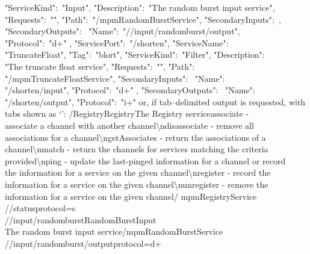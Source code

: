 "ServiceKind":\ "Input", "Description":\ "The random burst input service",\\
"Requests":\ "", "Path":\ "\textellipsis/mpmRandomBurstService", "SecondaryInputs":\
\sqPair,\\
"SecondaryOutputs":\ \openSq{} \textbraceleft{} "Name":\ 
"/\serviceName/input/randomburst/output",\\
"Protocol":\ "d+" \textbraceright{} \closeSq{} \textbraceright, \textbraceleft{}
"ServicePort":\  "/shorten", "ServiceName":\ \\
"TruncateFloat", "Tag":\ "blort", "ServiceKind":\ "Filter", "Description":\ \\
"The truncate float service", "Requests":\ "", "Path":\ \\
"\textellipsis/mpmTruncateFloatService", "SecondaryInputs":\ \openSq{} \textbraceleft{}
"Name":\ \\
"/shorten/input", "Protocol":\ "d+" \textbraceright{} \closeSq, "SecondaryOutputs":\ 
\openSq{} \textbraceleft{} "Name":\ \\
"/shorten/output", "Protocol":\ "i+" \textbraceright{} \closeSq{} \textbraceright{}
\closeSq
\outputEnd{}
or, if tab--delimited output is requested, with tabs shown as `\tabSymbol':
\outputBegin{}
/\dollarService\pseudotab{}Registry\pseudotab{}Registry\pseudotab\pseudotab{}The Registry
service\pseudotab{}associate - \\
associate a channel with another channel\textbackslash{}ndisassociate - remove all\\
associations for a channel\textbackslash{}ngetAssociates - return the associations of a\\
channel\textbackslash{}nmatch - return the channels for services matching the criteria\\
provided\textbackslash{}nping - update the last-pinged information for a channel or
record\\
the information for a service on the given channel\textbackslash{}nregister - record the\\
information for a service on the given channel\textbackslash{}nunregister - remove the\\
information for a service on the given channel\pseudotab\textellipsis/%
mpmRegistryService\pseudotwotabs\\
/\dollarService/status\textbraceleft{}protocol=s\textbraceright\\

/\serviceName/input/randomburst\pseudotab{}RandomBurst\pseudotab\pseudotab{}Input
\pseudotab\\
The random burst input service\pseudotwotabs\textellipsis/mpmRandomBurstService%
\pseudotwotabs\\
/\serviceName/input/randomburst/output\textbraceleft{}protocol=d+\textbraceright\\


